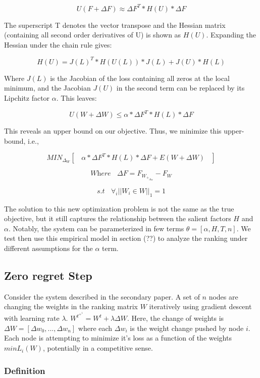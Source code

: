 \documentclass{article}
\begin{document}
\[ U(F + \Delta F) \approx \Delta F^T *  H(U) * \Delta F\]

The superscript T denotes the vector transpose and the Hessian matrix (containing all second order derivatives of U) is shown as $H(U)$. Expanding the Hessian under the chain rule gives:
\bigskip

\[ H(U) = J(L)^T * H(U(L)) * J(L) + J(U) * H(L) \]

Where $J(L)$ is the Jacobian of the loss containing all zeros at the local minimum, and the Jacobian $J(U)$ in the second term can be replaced by its Lipchitz factor $\alpha$. This leaves:
\bigskip

\[ U(W + \Delta W) \leq \alpha * \Delta F^T * H(L) * \Delta F\]

This reveals an upper bound on our objective. Thus, we minimize this upper-bound, i.e.,

\[ \textit{MIN}_\Delta_W [ \ \ \ \ \alpha * \Delta F^T * H(L) * \Delta F  + E(W + \Delta W) \ \ \ \ ] \]

\[ \textit{Where} \ \ \ \ \Delta F = F_W_+_\Delta_W - F_W \]

\[ \textit{s.t} \ \ \ \  \forall_i || W_i \in W ||_1 = 1\]

The solution to this new optimization problem is not the same as the true objective, but it still captures the relationship between the salient factors $H$ and $\alpha$. Notably, the system can be parameterized in few terms $\theta = [\alpha, H, T, n]$. We test then use this empirical model in section (??) to analyze the ranking under different assumptions for the $\alpha$ term. 

\subsection{Zero regret Step}
 
Consider the system described in the secondary paper. A set of $n$ nodes are changing the weights in the ranking matrix $W$ iteratively using gradient descent with learning rate $\lambda$. $W^t^+^1 = W^t + \lambda \Delta W$. Here, the change of weights is $\Delta W = [\Delta w_0, ... , \Delta w_n]$ where each $\Delta w_i$ is the weight change pushed by node $i$. Each node is attempting to minimize it's loss as a function of the weights  $min L_i(W)$, potentially in a competitive sense.

\subsubsection{Definition}
\end{document}
